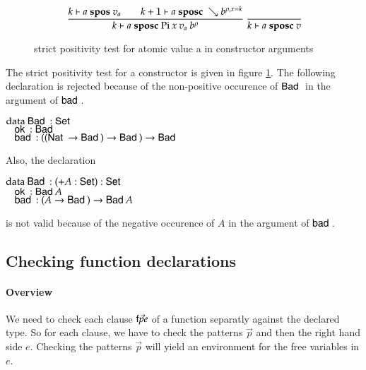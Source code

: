 \begin{figure}[p]
\label{sposcf}
\begin{gather*}
\ \dfrac{ k\vdash a\mbox{ \textbf{spos} }v_a \qquad k+1\vdash a\mbox{ \textbf{sposc} }\searrow b^{\rho,x=k}}{k\vdash a\mbox{ \textbf{sposc} }\mathrm{Pi} \: x \: v_a \: b^{\rho}  }
\ \dfrac{}{k\vdash a\mbox{ \textbf{sposc} }v}
\end{gather*}
\caption{strict positivity test for atomic value a in constructor arguments}
\end{figure}

The strict positivity test for a constructor is given in figure \ref{sposcf}.
The following declaration is rejected because of the non-positive occurence of $\mathsf{Bad}\:$ in the argument of $\mathsf{bad}\:$.
\begin{bsp}
$\mathrm{data}\: \mathsf{Bad}\: : \mathsf{Set} $ \\
$\hspace*{3mm} \mathsf{ok}\: : \mathsf{Bad}\:$\\
$\hspace*{3mm} \mathsf{bad}\: : ((\mathsf{Nat}\: \rightarrow \mathsf{Bad}\:) \rightarrow \mathsf{Bad}\:) \rightarrow \mathsf{Bad}\:  $
\end{bsp}

Also, the declaration 
\begin{bsp}
$\mathrm{data}\: \mathsf{Bad}\: : ( + A : \mathsf{Set} ) : \mathsf{Set} $\\
$\hspace*{3mm} \mathsf{ok}\: : \mathsf{Bad}\: A$\\
$\hspace*{3mm} \mathsf{bad}\: : (A \rightarrow \mathsf{Bad}\:) \rightarrow \mathsf{Bad}\: A$
\end{bsp}
is not valid because of the negative occurence of $A$ in the argument of $\mathsf{bad}\:$.
\subsection{Checking function declarations}

\newcommand\checkcl[2]{#1\:\mathbf{checkcl}\:#2}
\newcommand\checkp[5]{(#1)\vdash#2\:\mathbf{Pat}\:#3\Rightarrow (#4),#5}
\newcommand\checkps[5]{(#1)\vdash#2\:\mathbf{Pats}\:#3\Rightarrow (#4),#5}
\newcommand\checkinacc[4]{(#1)\vdash#2\:\mathbf{checkinacc}\:#3 : #4}
\newcommand\unify[5]{#1,#2\vdash#3\:\mathbf{inst}\:#4\Rightarrow #5}
\newcommand\unifylist[5]{#1,#2\vdash#3\:\mathbf{inst_{list}}\:#4\Rightarrow #5}


\paragraph*{Overview}
We need to check each clause $\mathsf{f} \vec{p} e$ of a function separatly against the declared type.
So for each clause, we have to check the patterns $\vec{p}$ and then the right hand side $e$.
Checking the patterns $\vec{p}$ will yield an environment for the free variables in $e$.

